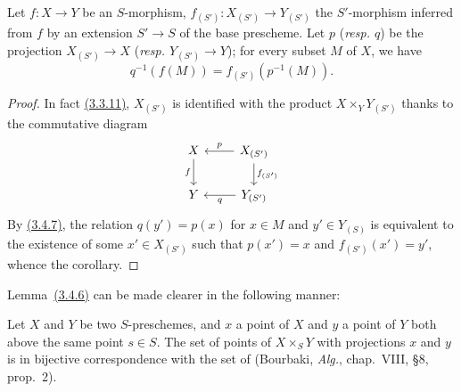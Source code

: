 \begin{cor}[3.4.8]
\label{cor-1.3.4.8}
Let $f\colon X\to Y$ be an $S$-morphism, $f_{(S')}\colon X_{(S')}\to Y_{(S')}$ the $S'$-morphism inferred from $f$ by an extension $S'\to S$ of the base prescheme.
Let $p$ (\emph{resp. $q$}) be the projection $X_{(S')}\to X$ (\emph{resp. $Y_{(S')}\to Y$}); for every subset $M$ of $X$, we have
\begin{equation*}
    q^{-1}(f(M)) = f_{(S')}(p^{-1}(M)).
\end{equation*}
\end{cor}

\begin{proof}
\label{proof-cor-1.3.4.8}
In fact \hyperref[cor-1.3.3.11]{(3.3.11)}, $X_{(S')}$ is identified with the product $X\times_Y Y_{(S')}$ thanks to the commutative diagram
\begin{equation*}
    \begin{tikzcd}
        X \ar[d, swap, "f"]
        & X_{(S')} \ar[l, swap, "p"] \ar[d, "f_{(S')}"]\\
        Y
        & Y_{(S')} \ar[l, "q"]
    \end{tikzcd}
\end{equation*}
By \hyperref[prop-1.3.4.7]{(3.4.7)}, the relation $q(y')=p(x)$ for $x\in M$ and $y'\in Y_{(S)}$ is equivalent to the existence of some $x'\in X_{(S')}$ such that $p(x')=x$ and $f_{(S')}(x')=y'$, whence the corollary.
\end{proof}

Lemma~\hyperref[lem-1.3.4.6]{(3.4.6)} can be made clearer in the following manner:
\begin{prop}[3.4.9]
\label{prop-1.3.4.9}
Let $X$ and $Y$ be two $S$-preschemes, and $x$ a point of $X$ and $y$ a point of $Y$ both above the same point $s\in S$.
The set of points of $X\times_S Y$ with projections $x$ and $y$ is in bijective correspondence with the set of  (Bourbaki, \emph{Alg.}, chap.~VIII, §8, prop.~2).
\end{prop}

